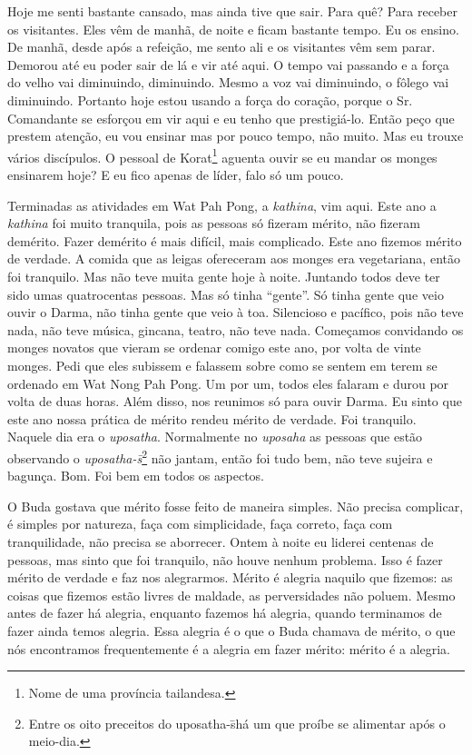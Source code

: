 Hoje me senti bastante cansado, mas ainda tive que sair. Para quê?
Para receber os visitantes. Eles vêm de manhã, de noite e ficam
bastante tempo. Eu os ensino. De manhã, desde após a refeição, me sento
ali e os visitantes vêm sem parar. Demorou até eu poder sair de lá e
vir até aqui. O tempo vai passando e a força do velho vai diminuindo,
diminuindo. Mesmo a voz vai diminuindo, o fôlego vai diminuindo.
Portanto hoje estou usando a força do coração, porque o Sr. Comandante
se esforçou em vir aqui e eu tenho que prestigiá-lo. Então peço que
prestem atenção, eu vou ensinar mas por pouco tempo, não muito. Mas eu
trouxe vários discípulos. O pessoal de Korat\footnote{Nome de uma
província tailandesa.} aguenta ouvir se eu mandar os monges ensinarem
hoje? E eu fico apenas de líder, falo só um pouco. 

Terminadas as atividades em Wat Pah Pong, a \textit{kathina}, vim
aqui. Este ano a \textit{kathina} foi muito tranquila, pois as pessoas
só fizeram mérito, não fizeram demérito. Fazer demérito é mais difícil,
mais complicado. Este ano fizemos mérito de verdade. A comida que as
leigas ofereceram aos monges era vegetariana, então foi tranquilo. Mas
não teve muita gente hoje à noite. Juntando todos deve ter sido umas
quatrocentas pessoas. Mas só tinha “gente”. Só tinha gente que veio
ouvir o Darma, não tinha gente que veio à toa. Silencioso e pacífico,
pois não teve nada, não teve música, gincana, teatro, não teve nada.
Começamos convidando os monges novatos que vieram se ordenar comigo
este ano, por volta de vinte monges. Pedi que eles subissem e falassem
sobre como se sentem em terem se ordenado em Wat Nong Pah Pong. Um por
um, todos eles falaram e durou por volta de duas horas. Além disso, nos
reunimos só para ouvir Darma. Eu sinto que este ano nossa prática de
mérito rendeu mérito de verdade. Foi tranquilo. Naquele dia era o
\textit{uposatha}. Normalmente no \textit{uposaha} as pessoas que estão
observando o \textit{uposatha-s\=\ila}\footnote{Entre os oito preceitos
do uposatha-s\=\ila há um que proíbe se alimentar após o meio-dia.} não
jantam, então foi tudo bem, não teve sujeira e bagunça. Bom. Foi bem em
todos os aspectos. 

O Buda gostava que mérito fosse feito de maneira simples. Não
precisa complicar, é simples por natureza, faça com simplicidade, faça
correto, faça com tranquilidade, não precisa se aborrecer. Ontem à
noite eu liderei centenas de pessoas, mas sinto que foi tranquilo, não
houve nenhum problema. Isso é fazer mérito de verdade e faz nos
alegrarmos. Mérito é alegria naquilo que fizemos: as coisas que fizemos
estão livres de maldade, as perversidades não poluem. Mesmo antes de
fazer há alegria, enquanto fazemos há alegria, quando terminamos de
fazer ainda temos alegria. Essa alegria é o que o Buda chamava de
mérito, o que nós encontramos frequentemente é a alegria em fazer
mérito: mérito é a alegria. 

